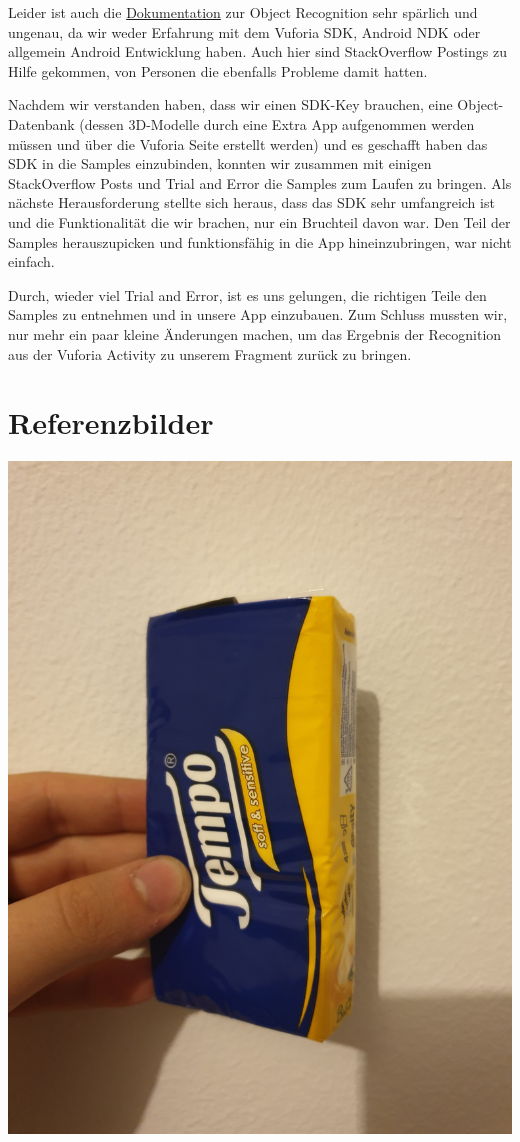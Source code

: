 \documentclass{mrtrash}
\begin{document}
Leider ist auch die \href{https://library.vuforia.com/content/vuforia-library/en/articles/Solution/How-To-Use-Object-Recognition-in-an-Android-App.html}{Dokumentation} zur Object Recognition sehr spärlich und ungenau, da wir weder Erfahrung mit dem Vuforia SDK, Android NDK oder allgemein Android Entwicklung haben. Auch hier sind StackOverflow Postings zu Hilfe gekommen, von Personen die ebenfalls Probleme damit hatten.

Nachdem wir verstanden haben, dass wir einen SDK-Key brauchen, eine Object-Datenbank (dessen 3D-Modelle durch eine Extra App aufgenommen werden müssen und über die Vuforia Seite erstellt werden) und es geschafft haben das SDK in die Samples einzubinden, konnten wir zusammen mit einigen StackOverflow Posts und Trial and Error die Samples zum Laufen zu bringen. Als nächste Herausforderung stellte sich heraus, dass das SDK sehr umfangreich ist und die Funktionalität die wir brachen, nur ein Bruchteil davon war. Den Teil der Samples herauszupicken und funktionsfähig in die App hineinzubringen, war nicht einfach.

Durch, wieder viel Trial and Error, ist es uns gelungen, die richtigen Teile den Samples zu entnehmen und in unsere App einzubauen. Zum Schluss mussten wir, nur mehr ein paar kleine Änderungen machen, um das Ergebnis der Recognition aus der Vuforia Activity zu unserem Fragment zurück zu bringen.

\newpage

\section{Referenzbilder}
\begin{minipage}[h]{\textwidth}
    \centering
    \includegraphics[height=\textwidth, angle=-90]{ref1.jpg}
\end{minipage}
\end{document}
